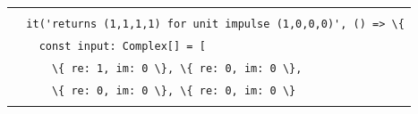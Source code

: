 \documentclass[
]{article}
\newcommand{\passthrough}[1]{#1}
\newcounter{none} %
\begin{document}
{\def\LTcaptype{none} %
\begin{longtable}[]{@{}
  >{\raggedright\arraybackslash}p{}@{}}
\toprule\noalign{}
\endhead
\bottomrule\noalign{}
\endlastfoot
\begin{minipage}[t]{\linewidth}\raggedright
\passthrough{\lstinline!describe('computeDFT4',!}\passthrough{\lstinline! !}\passthrough{\lstinline!()!}\passthrough{\lstinline! !}\passthrough{\lstinline!=>!}\passthrough{\lstinline! !}\passthrough{\lstinline!\{!}\strut \\
\passthrough{\lstinline!  !}\passthrough{\lstinline!it('returns!}\passthrough{\lstinline! !}\passthrough{\lstinline!(1,1,1,1)!}\passthrough{\lstinline! !}\passthrough{\lstinline!for!}\passthrough{\lstinline! !}\passthrough{\lstinline!unit!}\passthrough{\lstinline! !}\passthrough{\lstinline!impulse!}\passthrough{\lstinline! !}\passthrough{\lstinline!(1,0,0,0)',!}\passthrough{\lstinline! !}\passthrough{\lstinline!()!}\passthrough{\lstinline! !}\passthrough{\lstinline!=>!}\passthrough{\lstinline! !}\passthrough{\lstinline!\{!}\strut \\
\passthrough{\lstinline!    !}\passthrough{\lstinline!const!}\passthrough{\lstinline! !}\passthrough{\lstinline!input:!}\passthrough{\lstinline! !}\passthrough{\lstinline!Complex[]!}\passthrough{\lstinline! !}\passthrough{\lstinline!=!}\passthrough{\lstinline! !}\passthrough{\lstinline![!}\strut \\
\passthrough{\lstinline!      !}\passthrough{\lstinline!\{!}\passthrough{\lstinline! !}\passthrough{\lstinline!re:!}\passthrough{\lstinline! !}\passthrough{\lstinline!1,!}\passthrough{\lstinline! !}\passthrough{\lstinline!im:!}\passthrough{\lstinline! !}\passthrough{\lstinline!0!}\passthrough{\lstinline! !}\passthrough{\lstinline!\},!}\passthrough{\lstinline! !}\passthrough{\lstinline!\{!}\passthrough{\lstinline! !}\passthrough{\lstinline!re:!}\passthrough{\lstinline! !}\passthrough{\lstinline!0,!}\passthrough{\lstinline! !}\passthrough{\lstinline!im:!}\passthrough{\lstinline! !}\passthrough{\lstinline!0!}\passthrough{\lstinline! !}\passthrough{\lstinline!\},!}\strut \\
\passthrough{\lstinline!      !}\passthrough{\lstinline!\{!}\passthrough{\lstinline! !}\passthrough{\lstinline!re:!}\passthrough{\lstinline! !}\passthrough{\lstinline!0,!}\passthrough{\lstinline! !}\passthrough{\lstinline!im:!}\passthrough{\lstinline! !}\passthrough{\lstinline!0!}\passthrough{\lstinline! !}\passthrough{\lstinline!\},!}\passthrough{\lstinline! !}\passthrough{\lstinline!\{!}\passthrough{\lstinline! !}\passthrough{\lstinline!re:!}\passthrough{\lstinline! !}\passthrough{\lstinline!0,!}\passthrough{\lstinline! !}\passthrough{\lstinline!im:!}\passthrough{\lstinline! !}\passthrough{\lstinline!0!}\passthrough{\lstinline! !}\passthrough{\lstinline!\}!}\strut \\

\end{minipage}
\end{longtable}}
\end{document}
